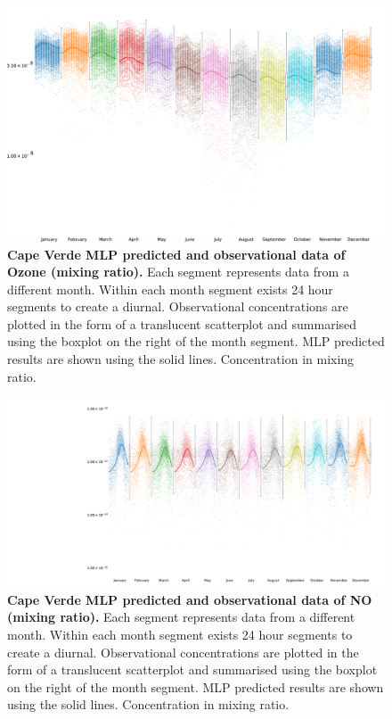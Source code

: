 \begin{figure}[H]
     \centering
         \includegraphics[width=.90\textheight,angle =90,trim={8cm 0 0 0}]{figures_c3/mlpregressor/CVNOX_CapeVerde/O3.png}
        \caption{\textbf{Cape Verde MLP predicted and observational data of Ozone (mixing ratio).} Each segment represents data from a different month. Within each month segment exists 24 hour segments to create a diurnal. Observational concentrations are plotted in the form of a translucent scatterplot and summarised using the boxplot on the right of the month segment. MLP predicted results are shown using the solid lines. Concentration in mixing ratio.}
        \label{fig:mlpo3}
\end{figure}

\begin{figure}[H]
     \centering
         \includegraphics[width=.90\textheight,angle =90,trim={8cm 0 0 0}]{figures_c3/mlpregressor/CVNOX_CapeVerde/NO.pdf}
        \caption{\textbf{Cape Verde MLP predicted and observational data of NO (mixing ratio).} Each segment represents data from a different month. Within each month segment exists 24 hour segments to create a diurnal. Observational concentrations are plotted in the form of a translucent scatterplot and summarised using the boxplot on the right of the month segment. MLP predicted results are shown using the solid lines. Concentration in mixing ratio.}
        \label{fig:mlpno}
\end{figure}

